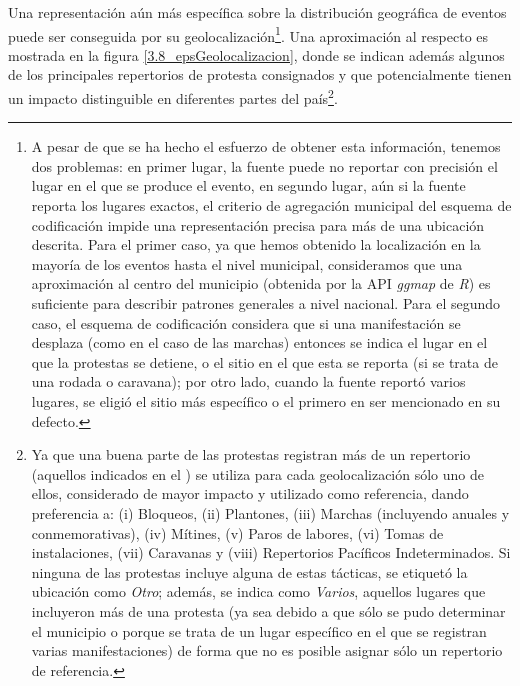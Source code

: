 \documentclass[letterpaper, 11pt]{book}
\theoremstyle{definition}
\theoremstyle{remark}
\begin{document}
Una representación aún más específica sobre la distribución geográfica de eventos puede ser conseguida por su geolocalización\footnote{
    A pesar de que se ha hecho el esfuerzo de obtener esta información, tenemos dos problemas: en primer lugar, la fuente puede no reportar con precisión el lugar en el que se produce el evento, en segundo lugar, aún si la fuente reporta los lugares exactos, el criterio de agregación municipal del esquema de codificación impide una representación precisa para más de una ubicación descrita.
    Para el primer caso, ya que hemos obtenido la localización en la mayoría de los eventos hasta el nivel municipal, consideramos que una aproximación al centro del municipio (obtenida por la API \emph{ggmap} de \emph{R}) es suficiente para describir patrones generales a nivel nacional.
    Para el segundo caso, el esquema de codificación considera que si una manifestación se desplaza (como en el caso de las marchas) entonces se indica el lugar en el que la protestas se detiene, o el sitio en el que esta se reporta (si se trata de una rodada o caravana); por otro lado, cuando la fuente reportó varios lugares, se eligió el sitio más específico o el primero en ser mencionado en su defecto.
}. 
Una aproximación al respecto es mostrada en la figura \ref{3.8_epsGeolocalizacion}, donde se indican además algunos de los principales repertorios de protesta consignados y que potencialmente tienen un impacto distinguible en diferentes partes del país\footnote{
    Ya que una buena parte de las protestas registran más de un repertorio (aquellos indicados en el ) se utiliza para cada geolocalización sólo uno de ellos, considerado de mayor impacto y utilizado como referencia, dando preferencia a: 
    (i) Bloqueos, 
    (ii) Plantones, 
    (iii) Marchas (incluyendo anuales y conmemorativas), 
    (iv) Mítines, 
    (v) Paros de labores, 
    (vi) Tomas de instalaciones, 
    (vii) Caravanas y 
    (viii) Repertorios Pacíficos Indeterminados. 
    Si ninguna de las protestas incluye alguna de estas tácticas, se etiquetó la ubicación como \emph{Otro}; además, se indica como \emph{Varios}, aquellos lugares que incluyeron más de una protesta (ya sea debido a que sólo se pudo determinar el municipio o porque se trata de un lugar específico en el que se registran varias manifestaciones) de forma que no es posible asignar sólo un repertorio de referencia. 
}. 
\end{document}
